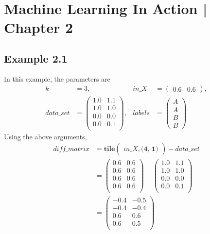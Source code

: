 \documentclass[11pt]{article}
\begin{document}
\section*{Machine Learning In Action | Chapter 2}
\subsection*{Example 2.1}
In this example, the parameters are
\begin{align*}
k&=3,&
in\_X &= \begin{pmatrix}0.6 & 0.6\end{pmatrix}, \\
data\_set &= 
\begin{pmatrix}
1.0&1.1\\
1.0&1.0\\
0.0&0.0\\
0.0&0.1\\
\end{pmatrix} , 
&labels &= \begin{pmatrix}
A \\ A \\ B \\ B
\end{pmatrix} 
\end{align*}
Using the above arguments, 
\begin{align*}
diff\_matrix &= 
\textbf{tile}\begin{pmatrix}
in\_X, \textbf{(4, 1)} 
\end{pmatrix}-  data\_set\\
&=\begin{pmatrix}
0.6&0.6\\
0.6&0.6\\
0.6&0.6\\
0.6&0.6\\
\end{pmatrix}
-
\begin{pmatrix}
1.0&1.1\\
1.0&1.0\\
0.0&0.0\\
0.0&0.1\\
\end{pmatrix}\\
&=
\begin{pmatrix}
-0.4&-0.5\\
-0.4&-0.4\\
0.6&0.6\\
0.6&0.5\\
\end{pmatrix}
\end{align*}
\end{document}

